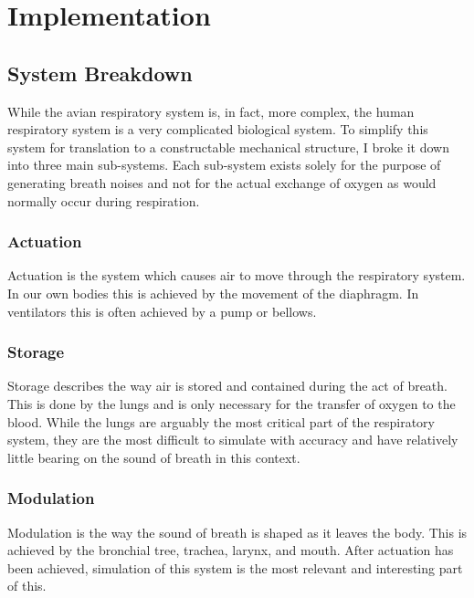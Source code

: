 \documentclass[letterpaper]{article}
\begin{document}


\section{Implementation}

\subsection{System Breakdown}

While the avian respiratory system is, in fact, more complex, the human respiratory system is a very complicated biological system. \cite{gasexchangers} To simplify this system for translation to a constructable mechanical structure, I broke it down into three main sub-systems. Each sub-system exists solely for the purpose of generating breath noises and not for the actual exchange of oxygen as would normally occur during respiration.

\subsubsection{Actuation}

Actuation is the system which causes air to move through the respiratory system. In our own bodies this is achieved by the movement of the diaphragm. In ventilators this is often achieved by a pump or bellows.

\subsubsection{Storage}

Storage describes the way air is stored and contained during the act of breath. This is done by the lungs and is only necessary for the transfer of oxygen to the blood. While the lungs are arguably the most critical part of the respiratory system, they are the most difficult to simulate with accuracy and have relatively little bearing on the sound of breath in this context. 

\subsubsection{Modulation}

Modulation is the way the sound of breath is shaped as it leaves the body. This is achieved by the bronchial tree, trachea, larynx, and mouth. After actuation has been achieved, simulation of this system is the most relevant and interesting part of this.   
\end{document}

